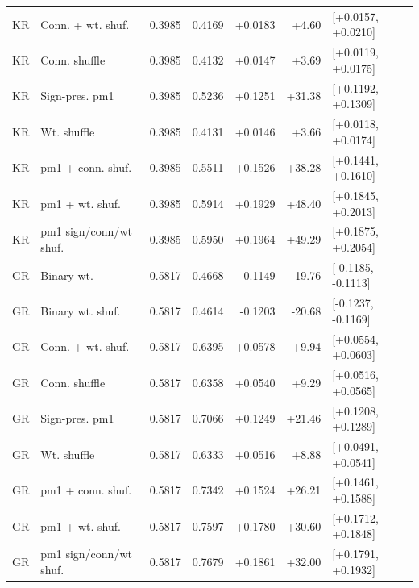 \begin{tabular}{llrrrrl}
KR & Conn. + wt. shuf. & 0.3985 & 0.4169 & +0.0183 & +4.60 & [+0.0157, +0.0210] \\
KR & Conn. shuffle & 0.3985 & 0.4132 & +0.0147 & +3.69 & [+0.0119, +0.0175] \\
KR & Sign-pres. pm1 & 0.3985 & 0.5236 & +0.1251 & +31.38 & [+0.1192, +0.1309] \\
KR & Wt. shuffle & 0.3985 & 0.4131 & +0.0146 & +3.66 & [+0.0118, +0.0174] \\
KR & pm1 + conn. shuf. & 0.3985 & 0.5511 & +0.1526 & +38.28 & [+0.1441, +0.1610] \\
KR & pm1 + wt. shuf. & 0.3985 & 0.5914 & +0.1929 & +48.40 & [+0.1845, +0.2013] \\
KR & pm1 sign/conn/wt shuf. & 0.3985 & 0.5950 & +0.1964 & +49.29 & [+0.1875, +0.2054] \\
GR & Binary wt. & 0.5817 & 0.4668 & -0.1149 & -19.76 & [-0.1185, -0.1113] \\
GR & Binary wt. shuf. & 0.5817 & 0.4614 & -0.1203 & -20.68 & [-0.1237, -0.1169] \\
GR & Conn. + wt. shuf. & 0.5817 & 0.6395 & +0.0578 & +9.94 & [+0.0554, +0.0603] \\
GR & Conn. shuffle & 0.5817 & 0.6358 & +0.0540 & +9.29 & [+0.0516, +0.0565] \\
GR & Sign-pres. pm1 & 0.5817 & 0.7066 & +0.1249 & +21.46 & [+0.1208, +0.1289] \\
GR & Wt. shuffle & 0.5817 & 0.6333 & +0.0516 & +8.88 & [+0.0491, +0.0541] \\
GR & pm1 + conn. shuf. & 0.5817 & 0.7342 & +0.1524 & +26.21 & [+0.1461, +0.1588] \\
GR & pm1 + wt. shuf. & 0.5817 & 0.7597 & +0.1780 & +30.60 & [+0.1712, +0.1848] \\
GR & pm1 sign/conn/wt shuf. & 0.5817 & 0.7679 & +0.1861 & +32.00 & [+0.1791, +0.1932] \\
\bottomrule
\end{tabular}
